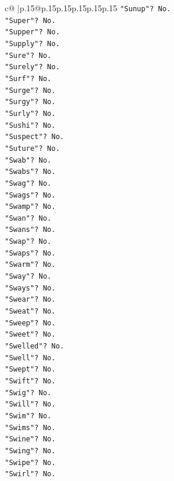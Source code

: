 \documentclass{article}
\begin{document}
{\begin{supertabular}{c@{$\;$}|p{.15\linewidth}@{}p{.15\linewidth}p{.15\linewidth}p{.15\linewidth}p{.15\linewidth}p{.15\linewidth}}
{{{\texttt{"Sunup"? No.} \\
\texttt{"Super"? No.} \\
\texttt{"Supper"? No.} \\
\texttt{"Supply"? No.} \\
\texttt{"Sure"? No.} \\
\texttt{"Surely"? No.} \\
\texttt{"Surf"? No.} \\
\texttt{"Surge"? No.} \\
\texttt{"Surgy"? No.} \\
\texttt{"Surly"? No.} \\
\texttt{"Sushi"? No.} \\
\texttt{"Suspect"? No.} \\
\texttt{"Suture"? No.} \\
\texttt{"Swab"? No.} \\
\texttt{"Swabs"? No.} \\
\texttt{"Swag"? No.} \\
\texttt{"Swags"? No.} \\
\texttt{"Swamp"? No.} \\
\texttt{"Swan"? No.} \\
\texttt{"Swans"? No.} \\
\texttt{"Swap"? No.} \\
\texttt{"Swaps"? No.} \\
\texttt{"Swarm"? No.} \\
\texttt{"Sway"? No.} \\
\texttt{"Sways"? No.} \\
\texttt{"Swear"? No.} \\
\texttt{"Sweat"? No.} \\
\texttt{"Sweep"? No.} \\
\texttt{"Sweet"? No.} \\
\texttt{"Swelled"? No.} \\
\texttt{"Swell"? No.} \\
\texttt{"Swept"? No.} \\
\texttt{"Swift"? No.} \\
\texttt{"Swig"? No.} \\
\texttt{"Swill"? No.} \\
\texttt{"Swim"? No.} \\
\texttt{"Swims"? No.} \\
\texttt{"Swine"? No.} \\
\texttt{"Swing"? No.} \\
\texttt{"Swipe"? No.} \\
\texttt{"Swirl"? No.} \\
}}}
\end{supertabular}}
\end{document}

